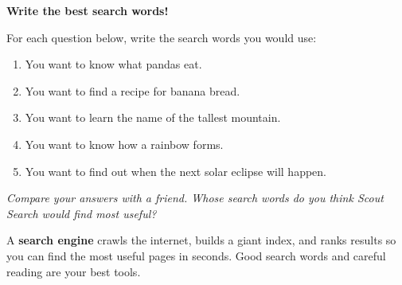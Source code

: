 \begin{tryit}
  \textbf{Write the best search words!}

  For each question below, write the search words you would use:

  \begin{enumerate}
    \item You want to know what pandas eat.
    \item You want to find a recipe for banana bread.
    \item You want to learn the name of the tallest mountain.
    \item You want to know how a rainbow forms.
    \item You want to find out when the next solar eclipse will happen.
  \end{enumerate}

  \emph{Compare your answers with a friend.
  Whose search words do you think Scout Search would find most useful?}
\end{tryit}

\sectionrule

\begin{bigidea}
  A \textbf{search engine} crawls the internet, builds a giant index, and ranks results
  so you can find the most useful pages in seconds.
  Good search words and careful reading are your best tools.
\end{bigidea}

